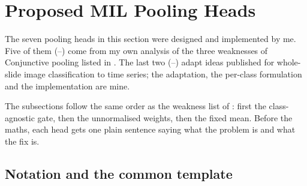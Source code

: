%
%

\section{Proposed MIL Pooling Heads}
\label{sec:pooling}

\begin{contribution}
The seven pooling heads in this section were designed and implemented by me. Five of them
(--) come from my own analysis of the three
weaknesses of Conjunctive pooling listed in . The last two
(--) adapt ideas published for whole-slide image
classification \citep{ilse2018attention, li2021dsmil} to time series; the adaptation, the per-class
formulation and the implementation are mine.
\end{contribution}

The subsections follow the same order as the weakness list of : first the
class-agnostic gate, then the unnormalised weights, then the fixed mean. Before the maths, each
head gets one plain sentence saying what the problem is and what the fix is.

\subsection{Notation and the common template}
\label{sec:pool:notation}

